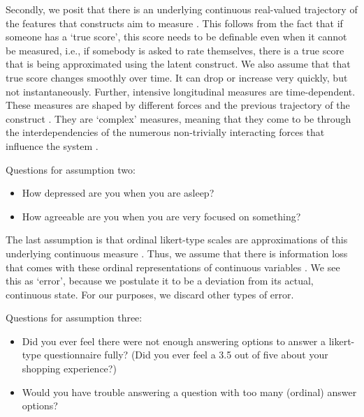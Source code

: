 \documentclass[utf8]{FrontiersinVancouver}
\begin{document}
Secondly, we posit that there is an underlying continuous real-valued trajectory of the features that constructs aim to measure \citep{hamakerNoTimePresent2017}. This follows from the fact that if someone has a `true score', this score needs to be definable even when it cannot be measured, i.e., if somebody is asked to rate themselves, there is a true score that is being approximated using the latent construct. We also assume that that true score changes smoothly over time. It can drop or increase very quickly, but not instantaneously. Further, intensive longitudinal measures are time-dependent. These measures are shaped by different forces and the previous trajectory of the construct \citep{olthofComplexityPsychologicalSelfratings2020b}. They are `complex' measures, meaning that they come to be through the interdependencies of the numerous non-trivially interacting forces that influence the system \citep{olthofComplexityTheoryPsychopathology2023}.

\begin{framed}
    Questions for assumption two:
    \begin{itemize}
        \item How depressed are you when you are asleep?
        \item How agreeable are you when you are very focused on something?
    \end{itemize}
\end{framed}

The last assumption is that ordinal likert-type scales are approximations of this underlying continuous measure \citep{haslbeckRecoveringWithinpersonDynamics2022}. Thus, we assume that there is information loss that comes with these ordinal representations of continuous variables \citep{westlandInformationLossBias2022}. We see this as `error', because we postulate it to be a deviation from its actual, continuous state. For our purposes, we discard other types of error.

\begin{framed}
    Questions for assumption three:
    \begin{itemize}
        \item Did you ever feel there were not enough answering options to answer a likert-type questionnaire fully? (Did you ever feel a 3.5 out of five about your shopping experience?)
        \item Would you have trouble answering a question with too many (ordinal) answer options?
    \end{itemize}
\end{framed}
\end{document}
